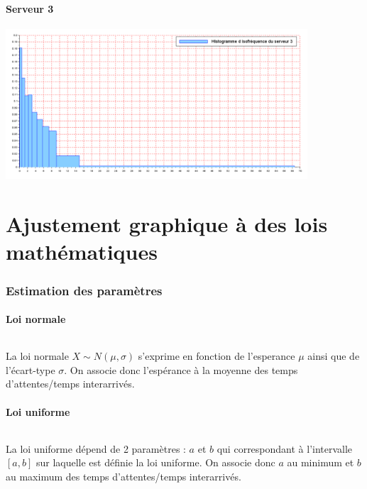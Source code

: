 \documentclass{article}
\begin{document}
\subsection{Serveur 3}
\begin{center}
\includegraphics[width=425px]{img/S3_histo.png}
\end{center}
\paragraph{}

\part{Ajustement graphique à des lois mathématiques}

\section{Estimation des paramètres}

\subsection{Loi normale}
\paragraph{}
La loi normale $X \sim N(\mu,\sigma)$ s'exprime en fonction de l'esperance $\mu$ ainsi que de l'écart-type $\sigma$. On associe donc l'espérance à la moyenne des temps d'attentes/temps interarrivés.

\subsection{Loi uniforme}
\paragraph{}
La loi uniforme dépend de 2 paramètres : $a$ et $b$ qui correspondant à l'intervalle $[a,b]$ sur laquelle est définie la loi uniforme. On associe donc $a$ au minimum et $b$ au maximum des temps d'attentes/temps interarrivés.
\end{document}
